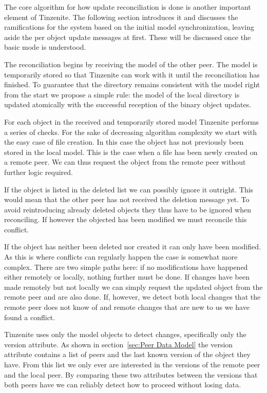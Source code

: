 The core algorithm for how update reconciliation is done is another important element of Tinzenite.
The following section introduces it and discusses the ramifications for the system based on the initial model synchronization, leaving aside the per object update messages at first.
These will be discussed once the basic mode is understood.

The reconciliation begins by receiving the model of the other peer.
The model is temporarily stored so that Tinzenite can work with it until the reconciliation has finished.
To guarantee that the directory remains consistent with the model right from the start we propose a simple rule: the model of the local directory is updated atomically with the successful reception of the binary object updates.

For each object in the received and temporarily stored model Tinzenite performs a series of checks.
For the sake of decreasing algorithm complexity we start with the easy case of file creation.
In this case the object has not previously been stored in the local model.
This is the case when a file has been newly created on a remote peer.
We can thus request the object from the remote peer without further logic required.

If the object is listed in the deleted list we can possibly ignore it outright.
This would mean that the other peer has not received the deletion message yet.
To avoid reintroducing already deleted objects they thus have to be ignored when reconciling.
If however the objected has been modified we must reconcile this conflict.

If the object has neither been deleted nor created it can only have been modified.
As this is where conflicts can regularly happen the case is somewhat more complex.
There are two simple paths here: if no modifications have happened either remotely or locally, nothing further must be done.
If changes have been made remotely but not locally we can simply request the updated object from the remote peer and are also done.
If, however, we detect both local changes that the remote peer does not know of and remote changes that are new to us we have found a conflict.

Tinzenite uses only the model objects to detect changes, specifically only the version attribute.
As shown in section~\ref{sec:Peer Data Model} the version attribute contains a list of peers and the last known version of the object they have.
From this list we only ever are interested in the versions of the remote peer and the local peer.
By comparing these two attributes between the versions that both peers have we can reliably detect how to proceed without losing data.

